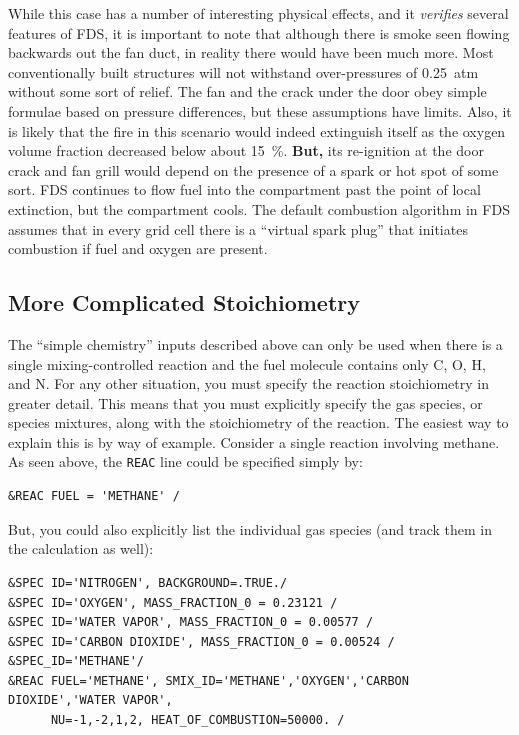 \documentclass[11pt]{book}
\newcommand{\ct}{\tt\small}
\begin{document}
While this case has a number of interesting physical effects, and it {\em verifies} several features of FDS, it is important to note that although
there is smoke seen flowing backwards out the fan duct, in reality there would have been much more. Most conventionally built structures will not withstand over-pressures
of 0.25~atm without some sort of relief. The fan and the crack under the door obey simple formulae based on pressure differences, but these assumptions have limits.
Also, it is likely that the fire in this scenario would indeed extinguish itself as the oxygen volume fraction decreased below about 15~\%. {\bf But,} its re-ignition at the door crack
and fan grill would depend on the presence of a spark or hot spot of some sort. FDS continues to flow fuel into the compartment past the point of local extinction, but the compartment
cools. The default combustion algorithm in FDS assumes that in every grid cell there is a ``virtual spark plug'' that initiates combustion if fuel and oxygen are
present.


\subsection{More Complicated Stoichiometry}


The ``simple chemistry''  inputs described above can only be used when there is a single mixing-controlled reaction and the fuel molecule contains only C, O, H, and N.
For any other situation, you must specify the reaction stoichiometry in greater detail. This means that you must explicitly specify the gas species, or species mixtures, along with
the stoichiometry of the reaction. The easiest way to explain this is by way of example. Consider a single reaction involving methane. As seen above, the {\ct REAC} line could be
specified simply by:

\footnotesize
\begin{verbatim}
&REAC FUEL = 'METHANE' /
\end{verbatim} \normalsize

\noindent But, you could also explicitly list the individual gas species (and track them in the calculation as well):

\footnotesize
\begin{verbatim}
&SPEC ID='NITROGEN', BACKGROUND=.TRUE./
&SPEC ID='OXYGEN', MASS_FRACTION_0 = 0.23121 /
&SPEC ID='WATER VAPOR', MASS_FRACTION_0 = 0.00577 /
&SPEC ID='CARBON DIOXIDE', MASS_FRACTION_0 = 0.00524 /
&SPEC_ID='METHANE'/
&REAC FUEL='METHANE', SMIX_ID='METHANE','OXYGEN','CARBON DIOXIDE','WATER VAPOR',
      NU=-1,-2,1,2, HEAT_OF_COMBUSTION=50000. /
\end{verbatim} \normalsize
\end{document}
